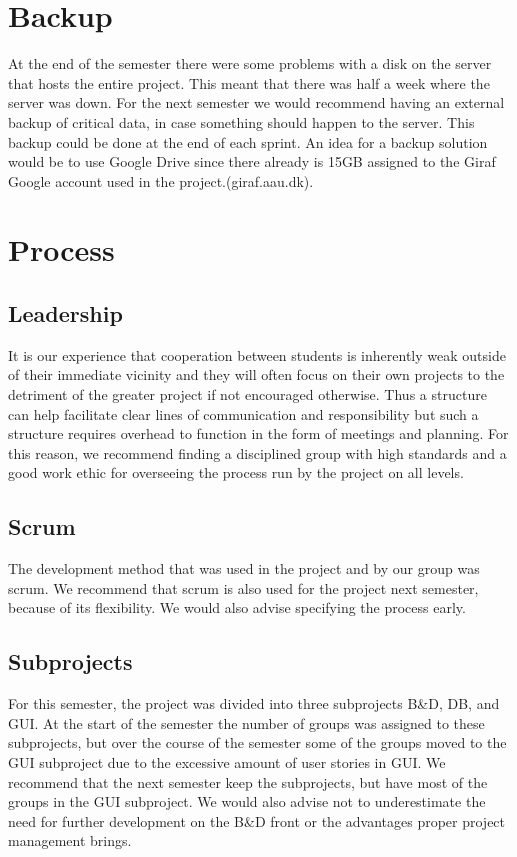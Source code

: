 \section{Backup}
At the end of the semester there were some problems with a disk on the server that hosts the entire project. This meant that there was half a week where the server was down. For the next semester we would recommend having an external backup of critical data, in case something should happen to the server. This backup could be done at the end of each sprint. An idea for a backup solution would be to use Google Drive since there already is 15GB assigned to the Giraf Google account used in the project.(giraf\@lists.aau.dk).

\section{Process}

\subsection{Leadership}
It is our experience that cooperation between students is inherently weak outside of their immediate vicinity and they will often focus on their own projects to the detriment of the greater project if not encouraged otherwise. Thus a structure can help facilitate clear lines of communication and responsibility but such a structure requires overhead to function in the form of meetings and planning.
For this reason, we recommend finding a disciplined group with high standards and a good work ethic for overseeing the process run by the project on all levels.

\subsection{Scrum}
The development method that was used in the project and by our group was scrum. We recommend that scrum is also used for the project next semester, because of its flexibility. We would also advise specifying the process early.

\subsection{Subprojects}
For this semester, the project was divided into three subprojects B\&D, DB, and GUI. At the start of the semester the number of groups was assigned to these subprojects, but over the course of the semester some of the groups moved to the GUI subproject due to the excessive amount of user stories in GUI. We recommend that the next semester keep the subprojects, but have most of the groups in the GUI subproject.
We would also advise not to underestimate the need for further development on the B\&D front or the advantages proper project management brings.

